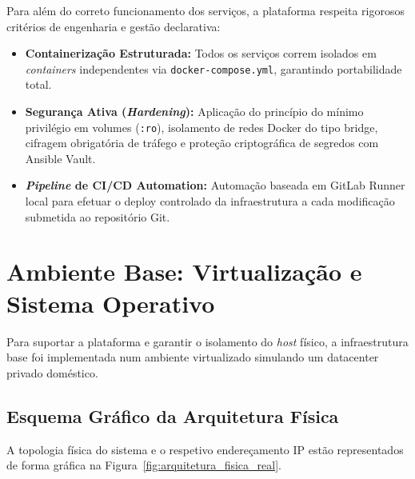Para além do correto funcionamento dos serviços, a plataforma respeita rigorosos critérios de engenharia e gestão declarativa:
\begin{itemize}
    \item \textbf{Containerização Estruturada:} Todos os serviços correm isolados em \textit{containers} independentes via \texttt{docker-compose.yml}, garantindo portabilidade total.
    \item \textbf{Segurança Ativa (\textit{Hardening}):} Aplicação do princípio do mínimo privilégio em volumes (\texttt{:ro}), isolamento de redes Docker do tipo bridge, cifragem obrigatória de tráfego e proteção criptográfica de segredos com Ansible Vault.
    \item \textbf{\textit{Pipeline} de CI/CD Automation:} Automação baseada em GitLab Runner local para efetuar o deploy controlado da infraestrutura a cada modificação submetida ao repositório Git.
\end{itemize}

\section{Ambiente Base: Virtualização e Sistema Operativo}

Para suportar a plataforma e garantir o isolamento do \textit{host} físico, a infraestrutura base foi implementada num ambiente virtualizado simulando um datacenter privado doméstico.

\subsection{Esquema Gráfico da Arquitetura Física}
A topologia física do sistema e o respetivo endereçamento IP estão representados de forma gráfica na Figura~\ref{fig:arquitetura_fisica_real}.

